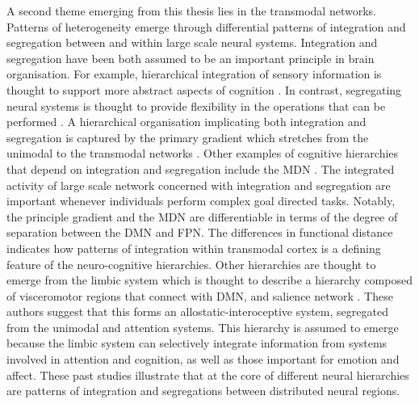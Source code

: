 A second theme emerging from this thesis lies in the transmodal networks. Patterns of heterogeneity emerge through differential patterns of integration and segregation between and within large scale neural systems. Integration and segregation have been both assumed to be an important principle in brain organisation. 
For example, hierarchical integration of sensory information is thought to support more abstract aspects of cognition \cite{Mesulam1998}. In contrast, segregating neural systems is thought to provide flexibility in the operations that can be performed \cite{Buckner2013}. A hierarchical organisation implicating both integration and segregation is captured by the primary gradient which stretches from the unimodal to the transmodal networks \cite{Margulies2016}.
Other examples of cognitive hierarchies that depend on integration and segregation include the MDN \cite{Duncan2010}. The integrated activity of large scale network concerned with integration and segregation are important whenever individuals perform complex goal directed tasks.  Notably, the principle gradient and the MDN are differentiable in terms of the degree of separation between the DMN and FPN. The differences in functional distance indicates how patterns of integration within transmodal cortex is a defining feature of the neuro-cognitive hierarchies. 
Other hierarchies are thought to emerge from the limbic system which is thought to describe a hierarchy composed of visceromotor regions that connect with DMN, and salience network \cite{Kleckner2017}. These authors suggest that this forms an allostatic-interoceptive system, segregated from the unimodal and attention systems. This hierarchy is assumed to emerge because the limbic system can selectively integrate information from systems involved in attention and cognition, as well as those important for emotion and affect. 
These past studies illustrate that at the core of different neural hierarchies are patterns of integration and segregations between distributed neural regions.

